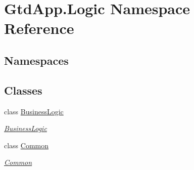 \hypertarget{namespace_gtd_app_1_1_logic}{}\section{Gtd\+App.\+Logic Namespace Reference}
\label{namespace_gtd_app_1_1_logic}
\subsection*{Namespaces}
\begin{DoxyCompactItemize}
\end{DoxyCompactItemize}
\subsection*{Classes}
\begin{DoxyCompactItemize}
\item 
class \mbox{\hyperlink{class_gtd_app_1_1_logic_1_1_business_logic}{Business\+Logic}}
\begin{DoxyCompactList}\small\item\em \mbox{\hyperlink{class_gtd_app_1_1_logic_1_1_business_logic}{Business\+Logic}} \end{DoxyCompactList}\item 
class \mbox{\hyperlink{class_gtd_app_1_1_logic_1_1_common}{Common}}
\begin{DoxyCompactList}\small\item\em \mbox{\hyperlink{class_gtd_app_1_1_logic_1_1_common}{Common}} \end{DoxyCompactList}\end{DoxyCompactItemize}
